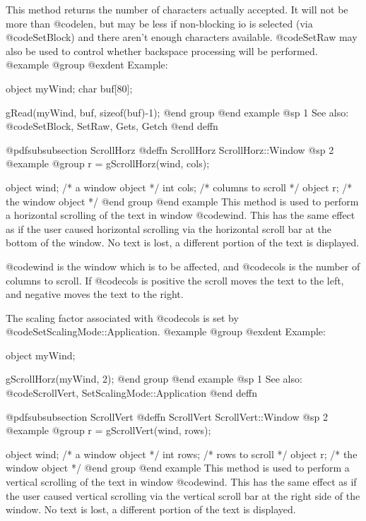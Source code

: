 This method returns the number of characters actually accepted.  It will
not be more than @code{len}, but may be less if non-blocking io is selected
(via @code{SetBlock}) and there aren't enough characters available.
@code{SetRaw} may also be used to control whether backspace processing will
be performed.
@example
@group
@exdent Example:

object  myWind;
char    buf[80];

gRead(myWind, buf, sizeof(buf)-1);
@end group
@end example
@sp 1
See also:  @code{SetBlock, SetRaw, Gets, Getch}
@end deffn














@pdfsubsubsection {ScrollHorz}
@deffn {ScrollHorz} ScrollHorz::Window
@sp 2
@example
@group
r = gScrollHorz(wind, cols);

object  wind;   /*  a window object     */
int     cols;   /*  columns to scroll   */
object  r;      /*  the window object   */
@end group
@end example
This method is used to perform a horizontal scrolling of the text in
window @code{wind}.  This has the same effect as if the user caused
horizontal scrolling via the horizontal scroll bar at the bottom
of the window.  No text is lost, a different portion of the text is
displayed.

@code{wind} is the window which is to be affected, and @code{cols} is the
number of columns to scroll.  If @code{cols} is positive the scroll moves
the text to the left, and negative moves the text to the right.

The scaling factor associated with @code{cols} is set by
@code{SetScalingMode::Application}.
@example
@group
@exdent Example:

object  myWind;

gScrollHorz(myWind, 2);
@end group
@end example
@sp 1
See also:  @code{ScrollVert, SetScalingMode::Application}
@end deffn











@pdfsubsubsection {ScrollVert}
@deffn {ScrollVert} ScrollVert::Window
@sp 2
@example
@group
r = gScrollVert(wind, rows);

object  wind;   /*  a window object     */
int     rows;   /*  rows to scroll      */
object  r;      /*  the window object   */
@end group
@end example
This method is used to perform a vertical scrolling of the text in
window @code{wind}.  This has the same effect as if the user caused
vertical scrolling via the vertical scroll bar at the right side
of the window.  No text is lost, a different portion of the text is
displayed.

